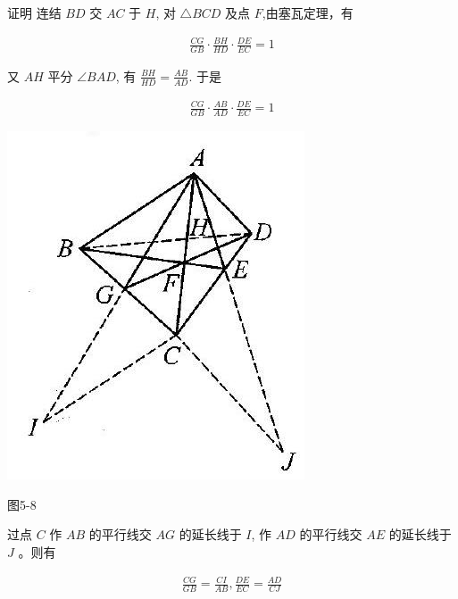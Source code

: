 \documentclass[10pt]{article}
\begin{document}
证明 连结 $B D$ 交 $A C$ 于 $H$, 对 $\triangle B C D$ 及点 $F$,由塞瓦定理，有

\begin{align*}
\frac{C G}{G B} \cdot \frac{B H}{H D} \cdot \frac{D E}{E C}=1
\end{align*}

又 $A H$ 平分 $\angle B A D$, 有 $\frac{B H}{H D}=\frac{A B}{A D}$. 于是

\begin{align*}
\frac{C G}{G B} \cdot \frac{A B}{A D} \cdot \frac{D E}{E C}=1
\end{align*}

\begin{center}
\includegraphics[max width=\textwidth]{2024_10_30_2c8f45efd4a519b08e1ag-051(1)}
\end{center}

图5-8

过点 $C$ 作 $A B$ 的平行线交 $A G$ 的延长线于 $I$, 作 $A D$ 的平行线交 $A E$ 的延长线于 $J$ 。则有

\begin{align*}
\frac{C G}{G B}=\frac{C I}{A B}, \frac{D E}{E C}=\frac{A D}{C J}
\end{align*}
\end{document}
